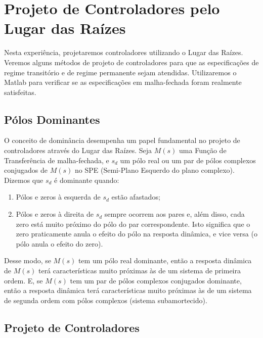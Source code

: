 \documentclass[
]{book}
\providecommand{\tightlist}{%
  \setlength{\itemsep}{0pt}\setlength{\parskip}{0pt}}
\theoremstyle{definition}
\theoremstyle{definition}
\theoremstyle{definition}
\theoremstyle{remark}
\begin{document}
\hypertarget{lab9}{%
\chapter{Projeto de Controladores pelo Lugar das Raízes}\label{lab9}}

Nesta experiência, projetaremos controladores utilizando o Lugar das Raízes. Veremos alguns métodos de projeto de controladores para que as especificações de regime transitório e de regime permanente sejam atendidas. Utilizaremos o Matlab para verificar se as especificações em malha-fechada foram realmente satisfeitas.

\hypertarget{puxf3los-dominantes}{%
\section{Pólos Dominantes}\label{puxf3los-dominantes}}

O conceito de dominância desempenha um papel fundamental no projeto de controladores através do Lugar das Raízes. Seja \(M(s)\) uma Função de Transferência de malha-fechada, e \(s_d\) um pólo real ou um par de pólos complexos conjugados de \(M(s)\) no SPE (Semi-Plano Esquerdo do plano complexo). Dizemos que \(s_d\) é dominante quando:

\begin{enumerate}
\def\labelenumi{\arabic{enumi}.}
\tightlist
\item
  Pólos e zeros à esquerda de \(s_d\) estão afastados;
\item
  Pólos e zeros à direita de \(s_d\) sempre ocorrem aos pares e, além disso, cada zero está muito próximo do pólo do par correspondente. Isto significa que o zero praticamente anula o efeito do pólo na resposta dinâmica, e vice versa (o pólo anula o efeito do zero).
\end{enumerate}

Desse modo, se \(M(s)\) tem um pólo real dominante, então a resposta dinâmica de \(M(s)\) terá características muito próximas às de um sistema de primeira ordem. E, se \(M(s)\) tem um par de pólos complexos conjugados dominante, então a resposta dinâmica terá características muito próximas às de um sistema de segunda ordem com pólos complexos (sistema subamortecido).

\hypertarget{projeto-de-controladores}{%
\section{Projeto de Controladores}\label{projeto-de-controladores}}
\end{document}

